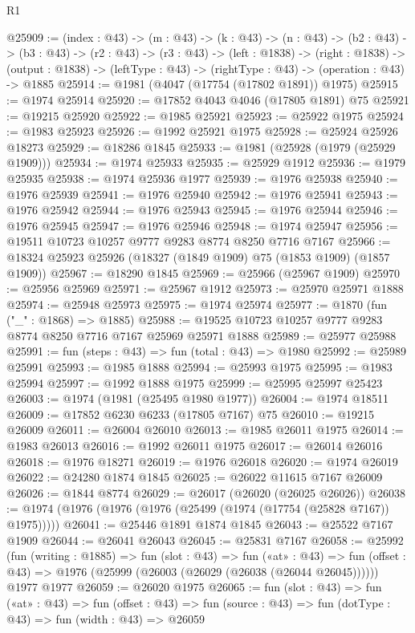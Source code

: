 \begin{lexlean}{R1}
\begin{coremodule}
@25909 := (index : @43) ->
  (m : @43) ->
  (k : @43) ->
  (n : @43) ->
  (b2 : @43) ->
  (b3 : @43) ->
  (r2 : @43) ->
  (r3 : @43) ->
  (left : @1838) ->
  (right : @1838) ->
  (output : @1838) -> (leftType : @43) -> (rightType : @43) -> (operation : @43) -> @1885
@25914 := @1981 (@4047 (@17754 (@17802 @1891)) @1975)
@25915 := @1974 @25914
@25920 := @17852 @4043 @4046 (@17805 @1891) @75
@25921 := @19215 @25920
@25922 := @1985 @25921
@25923 := @25922 @1975
@25924 := @1983 @25923
@25926 := @1992 @25921 @1975
@25928 := @25924 @25926 @18273
@25929 := @18286 @1845
@25933 := @1981 (@25928 (@1979 (@25929 @1909)))
@25934 := @1974 @25933
@25935 := @25929 @1912
@25936 := @1979 @25935
@25938 := @1974 @25936 @1977
@25939 := @1976 @25938
@25940 := @1976 @25939
@25941 := @1976 @25940
@25942 := @1976 @25941
@25943 := @1976 @25942
@25944 := @1976 @25943
@25945 := @1976 @25944
@25946 := @1976 @25945
@25947 := @1976 @25946
@25948 := @1974 @25947
@25956 := @19511 @10723 @10257 @9777 @9283 @8774 @8250 @7716 @7167
@25966 := @18324 @25923 @25926 (@18327 (@1849 @1909) @75 (@1853 @1909) (@1857 @1909))
@25967 := @18290 @1845
@25969 := @25966 (@25967 @1909)
@25970 := @25956 @25969
@25971 := @25967 @1912
@25973 := @25970 @25971 @1888
@25974 := @25948 @25973
@25975 := @1974 @25974
@25977 := @1870 (fun ("_" : @1868) => @1885)
@25988 := @19525 @10723 @10257 @9777 @9283 @8774 @8250 @7716 @7167 @25969 @25971 @1888
@25989 := @25977 @25988
@25991 := fun (steps : @43) => fun (total : @43) => @1980
@25992 := @25989 @25991
@25993 := @1985 @1888
@25994 := @25993 @1975
@25995 := @1983 @25994
@25997 := @1992 @1888 @1975
@25999 := @25995 @25997 @25423
@26003 := @1974 (@1981 (@25495 @1980 @1977))
@26004 := @1974 @18511
@26009 := @17852 @6230 @6233 (@17805 @7167) @75
@26010 := @19215 @26009
@26011 := @26004 @26010
@26013 := @1985 @26011 @1975
@26014 := @1983 @26013
@26016 := @1992 @26011 @1975
@26017 := @26014 @26016
@26018 := @1976 @18271
@26019 := @1976 @26018
@26020 := @1974 @26019
@26022 := @24280 @1874 @1845
@26025 := @26022 @11615 @7167 @26009
@26026 := @1844 @8774
@26029 := @26017 (@26020 (@26025 @26026))
@26038 := @1974 (@1976 (@1976 (@1976 (@25499 (@1974 (@17754 (@25828 @7167)) @1975)))))
@26041 := @25446 @1891 @1874 @1845
@26043 := @25522 @7167 @1909
@26044 := @26041 @26043
@26045 := @25831 @7167
@26058 := @25992
    (fun (writing : @1885) =>
    fun (slot : @43) =>
    fun («at» : @43) =>
    fun (offset : @43) => @1976 (@25999 (@26003 (@26029 (@26038 (@26044 @26045))))))
    @1977
    @1977
@26059 := @26020 @1975
@26065 := fun (slot : @43) =>
  fun («at» : @43) =>
  fun (offset : @43) => fun (source : @43) => fun (dotType : @43) => fun (width : @43) => @26059

\end{coremodule}
\end{lexlean}
